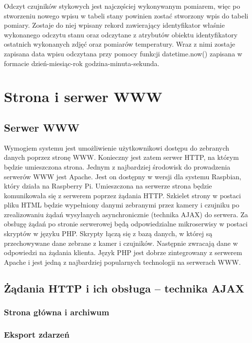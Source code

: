 \documentclass[a4paper,12pt,twoside]{article}
\begin{document}
Odczyt czujników stykowych jest najczęściej wykonywanym pomiarem, więc po stworzeniu nowego wpisu w tabeli stany powinien zostać stworzony wpis do tabeli pomiary. Zostaje do niej wpisany rekord zawierający identyfikator właśnie wykonanego odczytu stanu oraz odczytane z atrybutów obiektu identyfikatory ostatnich wykonanych zdjęć oraz pomiarów temperatury. Wraz z nimi zostaje zapisana data wpisu odczytana przy pomocy funkcji datetime.now() zapisana w formacie dzień-miesiąc-rok godzina-minuta-sekunda.
\newpage

\section{Strona i serwer WWW}

\subsection{Serwer WWW}
Wymogiem systemu jest umożliwienie użytkownikowi dostępu do zebranych danych poprzez stronę WWW. Konieczny jest zatem serwer HTTP, na którym będzie umieszczona strona. Jednym z najbardziej środowisk do prowadzenia serwerów WWW jest Apache. Jest on dostępny w wersji dla systemu Raspbian, który działa na Raspberry Pi. Umieszczona na serwerze strona będzie komunikowała się z serwerem poprzez żądania HTTP. Szkielet strony w postaci pliku HTML będzie wypełniony danymi zebranymi przez kamery i czujniku po zrealizowaniu żądań wysyłanych asynchronicznie (technika AJAX) do serwera. Za obsługę żądań po stronie serwerowej będą odpowiedzialne mikroserwisy w postaci skryptów w języku PHP. Skrypty łączą się z bazą danych, w której są przechowywane dane zebrane z kamer i czujników. Następnie zwracają dane w odpowiedzi na żądania klienta. Język PHP jest dobrze zintegrowany z serwerem Apache i jest jedną z najbardziej popularnych technologii na serwerach WWW. 
\subsection{Żądania HTTP i ich obsługa -- technika AJAX}

\subsubsection{Strona główna i archiwum}

\subsubsection{Eksport zdarzeń}
\end{document}
